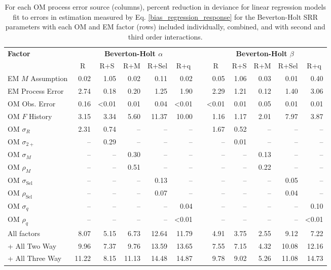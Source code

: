 \documentclass[
  12pt,
]{article}
\begin{document}
\begin{landscape}
\begin{table}
\caption{For each OM process error source (columns), percent reduction in deviance for linear regression models fit to errors in estimation measured by Eq. \ref{bias_regression_response} for the Beverton-Holt SRR parameters with each OM and EM factor (rows) included individually, combined, and with second and third order interactions.}\label{bias_SR_pars_PRD_table}
{\begin{center}
\begin{tabular}{lrrrrrcrrrrr}
\hline\hline
\multicolumn{1}{l}{\bfseries Factor}&\multicolumn{5}{c}{\bfseries Beverton-Holt $\alpha$}&\multicolumn{1}{c}{\bfseries }&\multicolumn{5}{c}{\bfseries Beverton-Holt $\beta$}\tabularnewline
\cline{2-6} \cline{8-12}
\multicolumn{1}{l}{}&\multicolumn{1}{c}{R}&\multicolumn{1}{c}{R+S}&\multicolumn{1}{c}{R+M}&\multicolumn{1}{c}{R+Sel}&\multicolumn{1}{c}{R+q}&\multicolumn{1}{c}{}&\multicolumn{1}{c}{R}&\multicolumn{1}{c}{R+S}&\multicolumn{1}{c}{R+M}&\multicolumn{1}{c}{R+Sel}&\multicolumn{1}{c}{R+q}\tabularnewline
\hline
EM $M$ Assumption& 0.02& 1.05& 0.02& 0.11& 0.02&& 0.05& 1.06& 0.03& 0.01& 0.40\tabularnewline
EM Process Error& 2.74& 0.18& 0.20& 1.25& 1.90&& 2.29& 1.21& 0.12& 1.40& 3.06\tabularnewline
OM Obs. Error& 0.16&\textless  0.01& 0.01& 0.04&\textless  0.01&&\textless  0.01& 0.01& 0.05& 0.01& 0.01\tabularnewline
OM $F$ History& 3.15& 3.34& 5.60&11.37&10.00&& 1.16& 1.17& 2.01& 7.97& 3.87\tabularnewline
OM $\sigma_R$& 2.31& 0.74&--&--&--&& 1.67& 0.52&--&--&--\tabularnewline
OM $\sigma_{2+}$ &--& 0.29&--&--&--&&--& 0.01&--&--&--\tabularnewline
OM $\sigma_M$&--&--& 0.30&--&--&&--&--& 0.13&--&--\tabularnewline
OM $\rho_M$&--&--& 0.51&--&--&&--&--& 0.22&--&--\tabularnewline
OM $\sigma_{\text{Sel}}$&--&--&--& 0.13&--&&--&--&--& 0.05&--\tabularnewline
OM $\rho_{\text{Sel}}$&--&--&--& 0.07&--&&--&--&--& 0.04&--\tabularnewline
OM $\sigma_q$&--&--&--&--& 0.04&&--&--&--&--& 0.10\tabularnewline
OM $\rho_q$&--&--&--&--&\textless  0.01&&--&--&--&--&\textless  0.01\tabularnewline
All factors& 8.07& 5.15& 6.73&12.64&11.79&& 4.91& 3.75& 2.55& 9.12& 7.22\tabularnewline
+ All Two Way& 9.96& 7.37& 9.76&13.59&13.65&& 7.55& 7.15& 4.32&10.08&12.16\tabularnewline
+ All Three Way&11.22& 8.15&11.13&14.48&14.87&& 9.78& 9.02& 5.26&11.08&14.73\tabularnewline
\hline
\end{tabular}\end{center}
}
\end{table}
\end{landscape}
\end{document}
